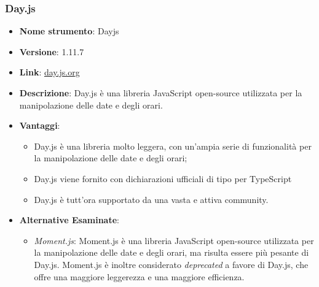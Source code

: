 \subsubsection{Day.js}
\begin{itemize}
      \item \textbf{Nome strumento}: Dayjs
      \item \textbf{Versione}: 1.11.7
      \item \textbf{Link}: \href{https://day.js.org/}{day.js.org}
      \item \textbf{Descrizione}: Day.js è una libreria JavaScript open-source utilizzata per la manipolazione delle date e degli orari.
      \item \textbf{Vantaggi}:
            \begin{itemize}
                  \item Day.js è una libreria molto leggera, con un'ampia serie di funzionalità per la manipolazione delle date e degli orari;
                  \item Day.js viene fornito con dichiarazioni ufficiali di tipo per TypeScript
                  \item Day.js è tutt'ora supportato da una vasta e attiva community.
            \end{itemize}
      \item \textbf{Alternative Esaminate}:
            \begin{itemize}
                  \item \textit{Moment.js}: Moment.js è una libreria JavaScript open-source utilizzata per la manipolazione delle date e degli orari, ma risulta essere più pesante
                        di Day.js. Moment.js è inoltre considerato \textit{deprecated} a favore di Day.js, che offre una maggiore leggerezza e una maggiore efficienza.
            \end{itemize}
\end{itemize}

